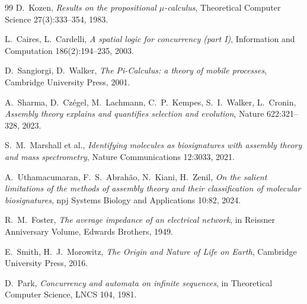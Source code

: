 \documentclass[11pt]{article}
\theoremstyle{plain}
\theoremstyle{definition}
\theoremstyle{remark}
\begin{document}
\begin{thebibliography}{99}
 D.~Kozen, \emph{Results on the propositional
$\mu$-calculus}, Theoretical Computer Science 27(3):333--354, 1983.

 L.~Caires, L.~Cardelli, \emph{A spatial logic for
concurrency (part I)}, Information and Computation 186(2):194--235, 2003.

 D.~Sangiorgi, D.~Walker, \emph{The Pi-Calculus: a
theory of mobile processes}, Cambridge University Press, 2001.

 A.~Sharma, D.~Czégel, M.~Lachmann, C.~P.~Kempes,
S.~I.~Walker, L.~Cronin, \emph{Assembly theory explains and quantifies
selection and evolution}, Nature 622:321--328, 2023.

 S.~M.~Marshall et al., \emph{Identifying molecules as
biosignatures with assembly theory and mass spectrometry}, Nature
Communications 12:3033, 2021.

 A.~Uthamacumaran, F.~S.~Abrah\~ao, N.~Kiani, H.~Zenil,
\emph{On the salient limitations of the methods of assembly theory and
their classification of molecular biosignatures}, npj Systems Biology and
Applications 10:82, 2024.

 R.~M.~Foster, \emph{The average impedance of an electrical
network}, in Reissner Anniversary Volume, Edwards Brothers, 1949.

 E.~Smith, H.~J.~Morowitz, \emph{The Origin and Nature of
Life on Earth}, Cambridge University Press, 2016.

 D.~Park, \emph{Concurrency and automata on infinite
sequences}, in Theoretical Computer Science, LNCS 104, 1981.

\end{thebibliography}
\end{document}
